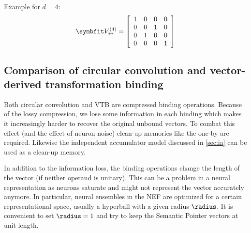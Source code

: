 Example for $d = 4$:
\begin{equation*}
    \mat V_{\leftrightarrow}^{(4)} = \sbr{\begin{array}{cccc}
            1 & 0 & 0 & 0 \\
            0 & 0 & 1 & 0 \\
            0 & 1 & 0 & 0 \\
            0 & 0 & 0 & 1
        \end{array}}
\end{equation*}

\subsection{Comparison of circular convolution and vector-derived transformation binding}
Both circular convolution and VTB are compressed binding operations.
Because of the lossy compression, we lose some information in each binding which makes it increasingly harder to recover the original unbound vectors.
To combat this effect (and the effect of neuron noise) clean-up memories like the one by \textcite{stewart2011} are required.
Likewise the independent accumulator model discussed in \cref{sec:ia} can be used as a clean-up memory.

In addition to the information loss, the binding operations change the length of the vector (if neither operand is unitary).
This can be a problem in a neural representation as neurons saturate and might not represent the vector accurately anymore.
In particular, neural ensembles in the NEF are optimized for a certain representational space, usually a hyperball with a given radius $\radius$.
It is convenient to set $\radius = 1$ and try to keep the Semantic Pointer vectors at unit-length.

